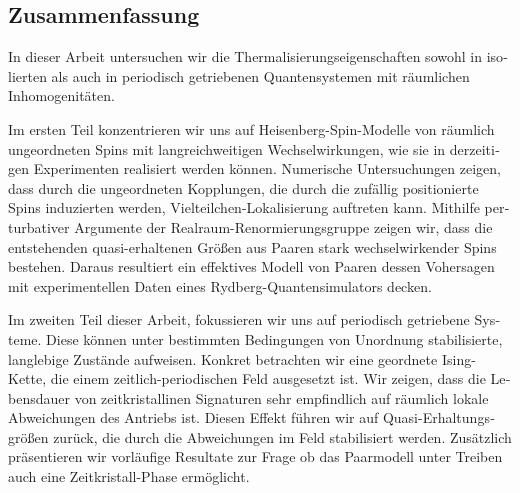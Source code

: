 \vfill
\begin{otherlanguage}{ngerman}
\chapter*{Zusammenfassung}

In dieser Arbeit untersuchen wir die Thermalisierungseigenschaften sowohl in isolierten als auch in periodisch getriebenen Quantensystemen mit räumlichen Inhomogenitäten.

Im ersten Teil konzentrieren wir uns auf Heisenberg-Spin-Modelle von räumlich ungeordneten Spins mit langreichweitigen Wechselwirkungen, wie sie in derzeitigen Experimenten realisiert werden können. Numerische Untersuchungen zeigen, dass durch die ungeordneten Kopplungen, die durch die zufällig positionierte Spins induzierten werden, Vielteilchen-Lokalisierung auftreten kann. Mithilfe perturbativer Argumente der Realraum-Renormierungsgruppe zeigen wir, dass die entstehenden quasi-erhaltenen Größen aus Paaren stark wechselwirkender Spins bestehen. Daraus resultiert ein effektives Modell von Paaren dessen Vohersagen mit experimentellen Daten eines Rydberg-Quantensimulators decken.

Im zweiten Teil dieser Arbeit, fokussieren wir uns auf periodisch getriebene Systeme. Diese können unter bestimmten Bedingungen von Unordnung stabilisierte, langlebige Zustände aufweisen. Konkret betrachten wir eine geordnete Ising-Kette, die einem zeitlich-periodischen Feld ausgesetzt ist. Wir zeigen, dass die Lebensdauer von zeitkristallinen Signaturen sehr empfindlich auf räumlich lokale Abweichungen des Antriebs ist. Diesen Effekt führen wir auf Quasi-Erhaltungsgrößen zurück, die durch die Abweichungen im Feld stabilisiert werden. Zusätzlich präsentieren wir vorläufige Resultate zur Frage ob das Paarmodell unter Treiben auch eine Zeitkristall-Phase ermöglicht.
\end{otherlanguage}

\endgroup

\vfill

\color{black}